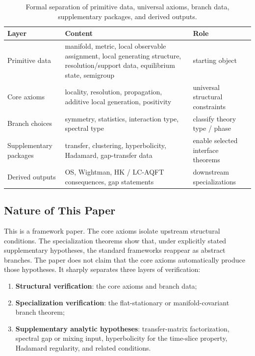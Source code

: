 \documentclass[12pt,a4paper]{article}
\theoremstyle{plain}
\theoremstyle{definition}
\theoremstyle{remark}
\begin{document}
\begin{table}[ht]
\centering
\renewcommand{\arraystretch}{1.2}
\begin{tabular}{@{}p{2.7cm}p{6.0cm}p{4.4cm}@{}}
\toprule
Layer & Content & Role \\
\midrule
Primitive data & manifold, metric, local observable assignment,
local generating structure, resolution/support data, equilibrium
state, semigroup & starting object \\
Core axioms & locality, resolution, propagation, additive local
generation, positivity & universal structural constraints \\
Branch choices & symmetry, statistics, interaction type, spectral
type & classify theory type / phase \\
Supplementary packages & transfer, clustering, hyperbolicity,
Hadamard, gap-transfer data & enable selected interface theorems \\
Derived outputs & OS, Wightman, HK / LC-AQFT consequences, gap
statements & downstream specializations \\
\bottomrule
\end{tabular}
\caption{Formal separation of primitive data, universal axioms, branch
  data, supplementary packages, and derived outputs.}
\label{tab:framework-layers}
\end{table}

\subsection{Nature of This Paper}

This is a framework paper. The core axioms isolate upstream
structural conditions. The specialization theorems show that, under
explicitly stated supplementary hypotheses, the standard frameworks
reappear as abstract branches. The paper does not claim that the core
axioms automatically produce those hypotheses. It sharply separates
three layers of verification:

\begin{enumerate}[nosep]
\item \textbf{Structural verification}: the core axioms and branch
  data;
\item \textbf{Specialization verification}: the flat-stationary or
  manifold-covariant branch theorem;
\item \textbf{Supplementary analytic hypotheses}: transfer-matrix
  factorization, spectral gap or mixing input, hyperbolicity for the
  time-slice property, Hadamard regularity, and related conditions.
\end{enumerate}
\end{document}
